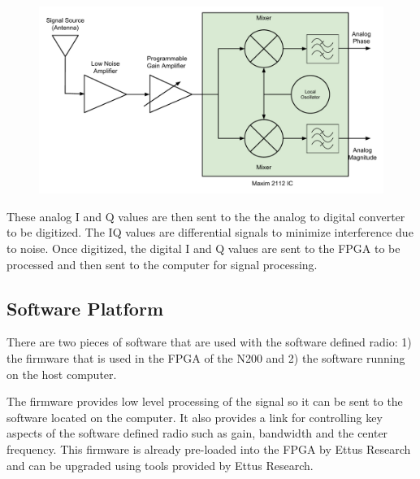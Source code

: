 {\begin{figure}[h!tb] 
\centering
\includegraphics[width=\textwidth]{Images/DBSRX2_block.pdf}
\label{dbsrx2_block}
\end{figure}
}


These analog I and Q values are then sent to the the analog to digital converter to be digitized.  The IQ values are differential signals to minimize interference due to noise.  Once digitized, the digital I and Q values are sent to the FPGA to be processed and then sent to the computer for signal processing.


\subsection{Software Platform} \label{software_platform}

There are two pieces of software that are used with the software defined radio:  1) the firmware that is used in the FPGA of the N200 and 2) the software running on the host computer.  

The firmware provides low level processing of the signal so it can be sent to the software located on the computer.  It also provides a link for controlling key aspects of the software defined radio such as gain, bandwidth and the center frequency.  This firmware is already pre-loaded into the FPGA by Ettus Research and can be upgraded using tools provided by Ettus Research.

